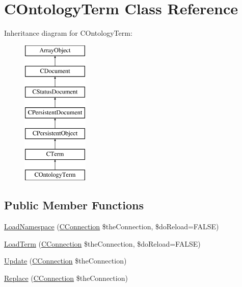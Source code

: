 \hypertarget{class_c_ontology_term}{\section{C\-Ontology\-Term Class Reference}
\label{class_c_ontology_term}
}
Inheritance diagram for C\-Ontology\-Term\-:\begin{figure}[H]
\begin{center}
\leavevmode
\includegraphics[height=7.000000cm]{class_c_ontology_term}
\end{center}
\end{figure}
\subsection*{Public Member Functions}
\begin{DoxyCompactItemize}
\item 
\hyperlink{class_c_ontology_term_a31fa356129d058361b7cdd88924b6c7d}{Load\-Namespace} (\hyperlink{class_c_connection}{C\-Connection} \$the\-Connection, \$do\-Reload=F\-A\-L\-S\-E)
\item 
\hyperlink{class_c_ontology_term_a36c2ab4ffdde63d0ca51734437faaa35}{Load\-Term} (\hyperlink{class_c_connection}{C\-Connection} \$the\-Connection, \$do\-Reload=F\-A\-L\-S\-E)
\item 
\hyperlink{class_c_ontology_term_ac39334977998a1e11c0e277eac4cef5c}{Update} (\hyperlink{class_c_connection}{C\-Connection} \$the\-Connection)
\item 
\hyperlink{class_c_ontology_term_ac1257616ac8626822f410bd858ce767c}{Replace} (\hyperlink{class_c_connection}{C\-Connection} \$the\-Connection)
\end{DoxyCompactItemize}
